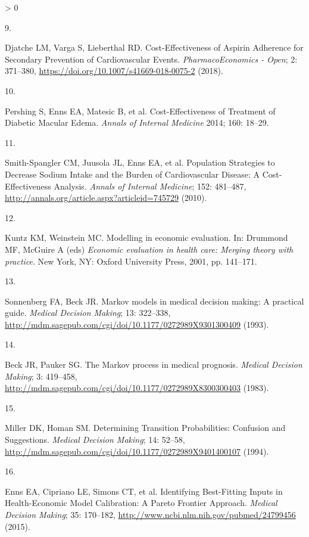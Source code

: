 \documentclass[
]{article}
\newlength{\cslhangindent}
\newlength{\csllabelwidth}
\newenvironment{CSLReferences}[2] %
 {%
  \setlength{\parindent}{0pt}
  \ifodd #1 \everypar{\setlength{\hangindent}{\cslhangindent}}\ignorespaces\fi
  \ifnum #2 > 0
  \setlength{\parskip}{#2\baselineskip}
  \fi
 }%
 {}
\newcommand{\CSLLeftMargin}[1]{\parbox[t]{\csllabelwidth}{#1}}
\newcommand{\CSLRightInline}[1]{\parbox[t]{\linewidth - \csllabelwidth}{#1}\break}
\begin{document}
\begin{CSLReferences}{0}{0}
\leavevmode\hypertarget{ref-Djatche2018}{}%
\CSLLeftMargin{9. }
\CSLRightInline{Djatche LM, Varga S, Lieberthal RD. {Cost-Effectiveness of Aspirin Adherence for Secondary Prevention of Cardiovascular Events}. \emph{PharmacoEconomics - Open}; 2: 371--380, \url{https://doi.org/10.1007/s41669-018-0075-2} (2018).}

\leavevmode\hypertarget{ref-Pershing2014}{}%
\CSLLeftMargin{10. }
\CSLRightInline{Pershing S, Enns EA, Matesic B, et al. {Cost-Effectiveness of Treatment of Diabetic Macular Edema}. \emph{Annals of Internal Medicine} 2014; 160: 18--29.}

\leavevmode\hypertarget{ref-Smith-Spangler2010}{}%
\CSLLeftMargin{11. }
\CSLRightInline{Smith-Spangler CM, Juusola JL, Enns EA, et al. {Population Strategies to Decrease Sodium Intake and the Burden of Cardiovascular Disease: A Cost-Effectiveness Analysis}. \emph{Annals of Internal Medicine}; 152: 481--487, \url{http://annals.org/article.aspx?articleid=745729} (2010).}

\leavevmode\hypertarget{ref-Kuntz2001}{}%
\CSLLeftMargin{12. }
\CSLRightInline{Kuntz KM, Weinstein MC. {Modelling in economic evaluation}. In: Drummond MF, McGuire A (eds) \emph{Economic evaluation in health care: Merging theory with practice}. New York, NY: Oxford University Press, 2001, pp. 141--171.}

\leavevmode\hypertarget{ref-Sonnenberg1993}{}%
\CSLLeftMargin{13. }
\CSLRightInline{Sonnenberg FA, Beck JR. {Markov models in medical decision making: A practical guide}. \emph{Medical Decision Making}; 13: 322--338, \url{http://mdm.sagepub.com/cgi/doi/10.1177/0272989X9301300409} (1993).}

\leavevmode\hypertarget{ref-Beck1983}{}%
\CSLLeftMargin{14. }
\CSLRightInline{Beck JR, Pauker SG. {The Markov process in medical prognosis}. \emph{Medical Decision Making}; 3: 419--458, \url{http://mdm.sagepub.com/cgi/doi/10.1177/0272989X8300300403} (1983).}

\leavevmode\hypertarget{ref-Miller1994}{}%
\CSLLeftMargin{15. }
\CSLRightInline{Miller DK, Homan SM. {Determining Transition Probabilities: Confusion and Suggestions}. \emph{Medical Decision Making}; 14: 52--58, \url{http://mdm.sagepub.com/cgi/doi/10.1177/0272989X9401400107} (1994).}

\leavevmode\hypertarget{ref-Enns2015e}{}%
\CSLLeftMargin{16. }
\CSLRightInline{Enns EA, Cipriano LE, Simons CT, et al. {Identifying Best-Fitting Inputs in Health-Economic Model Calibration: A Pareto Frontier Approach}. \emph{Medical Decision Making}; 35: 170--182, \url{http://www.ncbi.nlm.nih.gov/pubmed/24799456} (2015).}


\end{CSLReferences}
\end{document}
